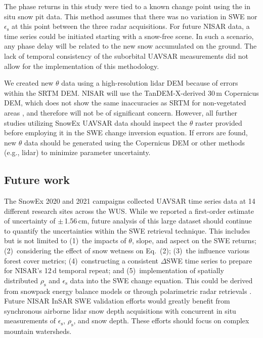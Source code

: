 The phase returns in this study were tied to a known change point using the in situ snow pit data. This method assumes that there was no variation in SWE nor $\epsilon_\mathrm{s}$ at this point between the three radar acquisitions. For future NISAR data, a time series could be initiated starting with a snow-free scene. In such a scenario, any phase delay will be related to the new snow accumulated on the ground. The lack of temporal consistency of the suborbital UAVSAR measurements did not allow for the implementation of this methodology.


We created new $\theta$ data using a high-resolution lidar DEM because of errors within the SRTM DEM. NISAR will use the TanDEM-X-derived 30\,m Copernicus DEM, which does not show the same inaccuracies as SRTM for non-vegetated areas \citep{rizzoliGenerationPerformanceAssessment2017}, and therefore will not be of significant concern. However, all further studies utilizing SnowEx UAVSAR data should inspect the $\theta$ raster provided before employing it in the SWE change inversion equation. If errors are found, new $\theta$ data should be generated using the Copernicus DEM or other methods (e.g., lidar) to minimize parameter uncertainty.


\hypertarget{ch4-discussion-3}{\subsection{Future work}\label{ch4-discussion-3}}


The SnowEx 2020 and 2021 campaigns collected UAVSAR time series data at 14 different research sites across the WUS. While we reported a first-order estimate of uncertainty of $\pm$\,1.56\,cm, future analysis of this large dataset should continue to quantify the uncertainties within the SWE retrieval technique. This includes but is not limited to (1)~the impacts of $\theta$, slope, and aspect on the SWE returns; (2)~considering the effect of snow wetness on Eq.~(2); (3)~the influence various forest cover metrics; (4)~constructing a consistent $\Delta$SWE time series to prepare for NISAR's 12\,d temporal repeat; and (5)~implementation of spatially distributed $\rho_\mathrm{s}$ and $\epsilon_\mathrm{s}$ data into the SWE change equation. This could be derived from snowpack energy balance models \citep{marksSpatiallyDistributedEnergy1999,listonDistributedSnowEvolutionModeling2006} or through polarimetric radar retrievals \citep{shiEstimationSnowWater2000}. Future NISAR InSAR SWE validation efforts would greatly benefit from synchronous airborne lidar snow depth acquisitions with concurrent in situ measurements of $\epsilon_\mathrm{s}$, $\rho_\mathrm{s}$, and snow depth. These efforts should focus on complex mountain watersheds.

